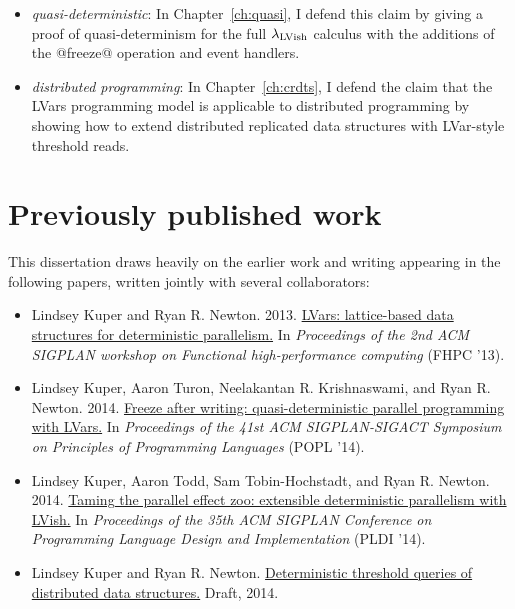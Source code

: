 \begin{itemize}
  \item \emph{quasi-deterministic}: In Chapter~\ref{ch:quasi}, I
    defend this claim by giving a proof of quasi-determinism for the
    full $\lambda_{\textrm{LVish}}$ calculus with the additions of the @freeze@
    operation and event handlers.

  \item \emph{distributed programming}: In Chapter~\ref{ch:crdts}, I
    defend the claim that the LVars programming model is applicable to
    distributed programming by showing how to extend distributed
    replicated data structures with LVar-style threshold reads.
\end{itemize}

\section{Previously published work}

This dissertation draws heavily on the earlier work and writing
appearing in the following papers, written jointly with several
collaborators:

\begin{itemize}
\item Lindsey Kuper and Ryan
  R. Newton. 2013. \href{http://doi.acm.org/10.1145/2502323.2502326}{LVars:
    lattice-based data structures for deterministic parallelism.} In
  \emph{Proceedings of the 2nd ACM SIGPLAN workshop on Functional
    high-performance computing} (FHPC '13).

\item Lindsey Kuper, Aaron Turon, Neelakantan R. Krishnaswami, and
  Ryan
  R. Newton. 2014. \href{http://doi.acm.org/10.1145/2535838.2535842
  }{Freeze after writing: quasi-deterministic parallel programming
    with LVars.} In \emph{Proceedings of the 41st ACM SIGPLAN-SIGACT
    Symposium on Principles of Programming Languages} (POPL '14).

\item Lindsey Kuper, Aaron Todd, Sam Tobin-Hochstadt, and Ryan
  R. Newton. 2014. \href{http://doi.acm.org/10.1145/2594291.2594312
  }{Taming the parallel effect zoo: extensible deterministic
    parallelism with LVish.} In \emph{Proceedings of the 35th ACM
    SIGPLAN Conference on Programming Language Design and
    Implementation} (PLDI '14).

\item Lindsey Kuper and Ryan
  R. Newton. \href{http://www.cs.indiana.edu/~lkuper/papers/threshold-queries-draft.pdf}{Deterministic
    threshold queries of distributed data structures.} Draft,
  2014.

\end{itemize}

